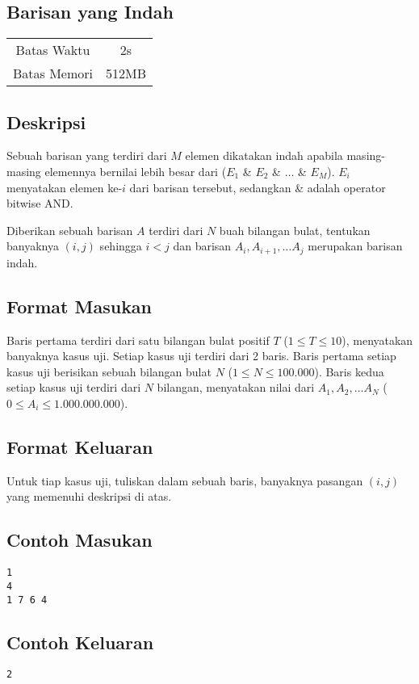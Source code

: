 \documentclass{article}
\begin{document}
\begin{center}
    \section*{Barisan yang Indah}

    \begin{tabular}{ | c c | }
        \hline
        Batas Waktu  & 2s \\
        Batas Memori & 512MB \\
        \hline
    \end{tabular}
\end{center}

\subsection*{Deskripsi}
Sebuah barisan yang terdiri dari $M$ elemen dikatakan indah apabila masing-masing elemennya bernilai lebih besar dari ($E_1$ \& $E_2$ \& $\dots$ \& $E_M$).
$E_i$ menyatakan elemen ke-$i$ dari barisan tersebut, sedangkan \& adalah operator bitwise AND.

Diberikan sebuah barisan $A$ terdiri dari $N$ buah bilangan bulat, tentukan banyaknya $(i, j)$ sehingga $i < j$ dan barisan $A_i, A_{i+1}, \dots A_j$ merupakan barisan indah.

\subsection*{Format Masukan}
Baris pertama terdiri dari satu bilangan bulat positif $T$ ($1 \leq T \leq 10$), menyatakan banyaknya kasus uji.
Setiap kasus uji terdiri dari 2 baris.
Baris pertama setiap kasus uji berisikan sebuah bilangan bulat $N$ ($1 \leq N \leq 100.000$).
Baris kedua setiap kasus uji terdiri dari $N$ bilangan, menyatakan nilai dari $A_1, A_2, \dots A_N$ ($0 \leq A_i \leq 1.000.000.000$).

\subsection*{Format Keluaran}
Untuk tiap kasus uji, tuliskan dalam sebuah baris, banyaknya pasangan $(i, j)$ yang memenuhi deskripsi di atas.
\\

\begin{multicols}{2}
\subsection*{Contoh Masukan}
\begin{lstlisting}
1
4
1 7 6 4
\end{lstlisting}
\columnbreak
\subsection*{Contoh Keluaran}
\begin{lstlisting}
2
\end{lstlisting}
\vfill
\null
\end{multicols}
\end{document}
